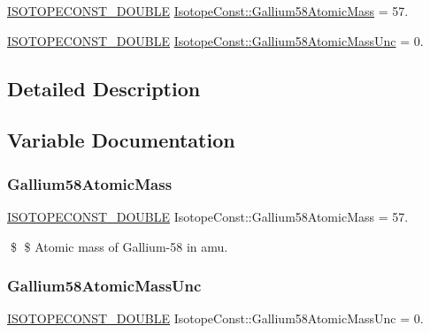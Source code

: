 \begin{DoxyCompactItemize}
\item 
\mbox{\hyperlink{group___isotope_const-_macros_ga8f45a7272ce02c0b4c65c44636ed719a}{I\+S\+O\+T\+O\+P\+E\+C\+O\+N\+S\+T\+\_\+\+D\+O\+U\+B\+LE}} \mbox{\hyperlink{group___isotope_const-_gallium-_ga58_ga6d3e0030b5560e84c8d5e8c1247693cd}{Isotope\+Const\+::\+Gallium58\+Atomic\+Mass}} = 57.
\item 
\mbox{\hyperlink{group___isotope_const-_macros_ga8f45a7272ce02c0b4c65c44636ed719a}{I\+S\+O\+T\+O\+P\+E\+C\+O\+N\+S\+T\+\_\+\+D\+O\+U\+B\+LE}} \mbox{\hyperlink{group___isotope_const-_gallium-_ga58_gaf4621f78e6d1eaaed289c0fab28cd9c2}{Isotope\+Const\+::\+Gallium58\+Atomic\+Mass\+Unc}} = 0.
\end{DoxyCompactItemize}


\subsection{Detailed Description}


\subsection{Variable Documentation}
\mbox{\label{group___isotope_const-_gallium-_ga58_ga6d3e0030b5560e84c8d5e8c1247693cd}} 
\subsubsection{\texorpdfstring{Gallium58\+Atomic\+Mass}{Gallium58AtomicMass}}
{\footnotesize\ttfamily \mbox{\hyperlink{group___isotope_const-_macros_ga8f45a7272ce02c0b4c65c44636ed719a}{I\+S\+O\+T\+O\+P\+E\+C\+O\+N\+S\+T\+\_\+\+D\+O\+U\+B\+LE}} Isotope\+Const\+::\+Gallium58\+Atomic\+Mass = 57.}

\$ \$ Atomic mass of Gallium-\/58 in amu. \mbox{\label{group___isotope_const-_gallium-_ga58_gaf4621f78e6d1eaaed289c0fab28cd9c2}} 
\subsubsection{\texorpdfstring{Gallium58\+Atomic\+Mass\+Unc}{Gallium58AtomicMassUnc}}
{\footnotesize\ttfamily \mbox{\hyperlink{group___isotope_const-_macros_ga8f45a7272ce02c0b4c65c44636ed719a}{I\+S\+O\+T\+O\+P\+E\+C\+O\+N\+S\+T\+\_\+\+D\+O\+U\+B\+LE}} Isotope\+Const\+::\+Gallium58\+Atomic\+Mass\+Unc = 0.}

